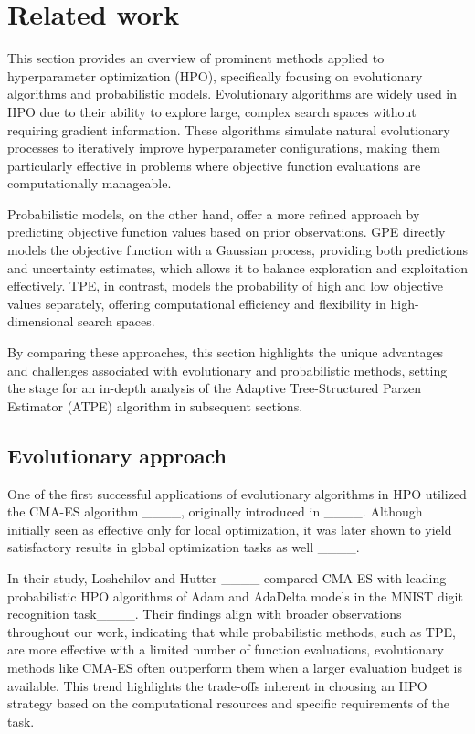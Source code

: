\section{Related work}
This section provides an overview of prominent methods applied to hyperparameter optimization (HPO), specifically focusing on evolutionary algorithms and probabilistic models. Evolutionary algorithms are widely used in HPO due to their ability to explore large, complex search spaces without requiring gradient information. These algorithms simulate natural evolutionary processes to iteratively improve hyperparameter configurations, making them particularly effective in problems where objective function evaluations are computationally manageable.

Probabilistic models, on the other hand, offer a more refined approach by predicting objective function values based on prior observations. GPE directly models the objective function with a Gaussian process, providing both predictions and uncertainty estimates, which allows it to balance exploration and exploitation effectively. TPE, in contrast, models the probability of high and low objective values separately, offering computational efficiency and flexibility in high-dimensional search spaces.

By comparing these approaches, this section highlights the unique advantages and challenges associated with evolutionary and probabilistic methods, setting the stage for an in-depth analysis of the Adaptive Tree-Structured Parzen Estimator (ATPE) algorithm in subsequent sections.

\subsection{Evolutionary approach}

One of the first successful applications of evolutionary algorithms in HPO utilized the CMA-ES algorithm ____, originally introduced in ____. Although initially seen as effective only for local optimization, it was later shown to yield satisfactory results in global optimization tasks as well ____.

In their study, Loshchilov and Hutter ____ compared CMA-ES with leading probabilistic HPO algorithms of Adam and AdaDelta models in the MNIST digit recognition task____. Their findings align with broader observations throughout our work, indicating that while probabilistic methods, such as TPE, are more effective with a limited number of function evaluations, evolutionary methods like CMA-ES often outperform them when a larger evaluation budget is available. This trend highlights the trade-offs inherent in choosing an HPO strategy based on the computational resources and specific requirements of the task.


